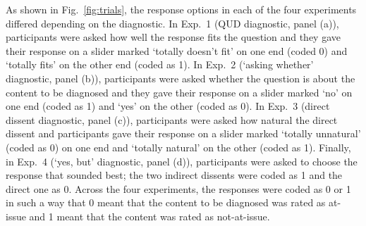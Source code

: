 \documentclass[times,linguex,xcolor]{glossa}
\begin{document}
  As shown in Fig.~\ref{fig:trials}, the response options in each of the four experiments differed depending on the diagnostic. In Exp.~1 (QUD diagnostic, panel (a)), participants were asked how well the response fits the question and they gave their response on a slider marked `totally doesn't fit' on one end (coded 0) and `totally fits' on the other end (coded as 1). In Exp.~2 (`asking whether' diagnostic, panel (b)), participants were asked whether the question is about the content to be diagnosed and they gave their response on a slider marked `no' on one end (coded as 1) and `yes' on the other (coded as 0). In Exp.~3 (direct dissent diagnostic, panel (c)), participants were asked how natural the direct dissent and participants gave their response on a slider marked `totally unnatural' (coded as 0) on one end and `totally natural' on the other (coded as 1). Finally, in Exp.~4 (`yes, but' diagnostic, panel (d)), participants were asked to choose the response that sounded best; the two indirect dissents were coded as 1 and the direct one as 0. Across the four experiments, the responses were coded as 0 or 1 in such a way that 0 meant that the content to be diagnosed was rated as at-issue and 1 meant that the content was rated as not-at-issue.
\end{document}
